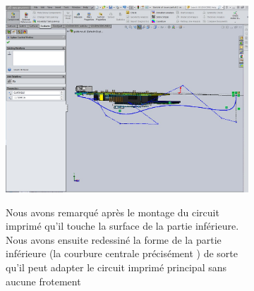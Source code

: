 \begin{figure}[!htbp]
    \centering
    \begin{subfigure}{.65\linewidth}
        \centering
        \includegraphics[width=\linewidth]{assets/conception1/img216.jpg}
    \end{subfigure}
    \hfill
    \begin{subfigure}[m]{.3\linewidth}
        Nous avons remarqué après le montage du circuit imprimé qu’il touche la surface de la partie inférieure. \\
        Nous avons ensuite redessiné la forme de la partie inférieure (la courbure centrale précisément ) de sorte qu’il peut adapter le circuit imprimé principal sans aucune frotement
    \end{subfigure}
\end{figure}

\FloatBarrier

